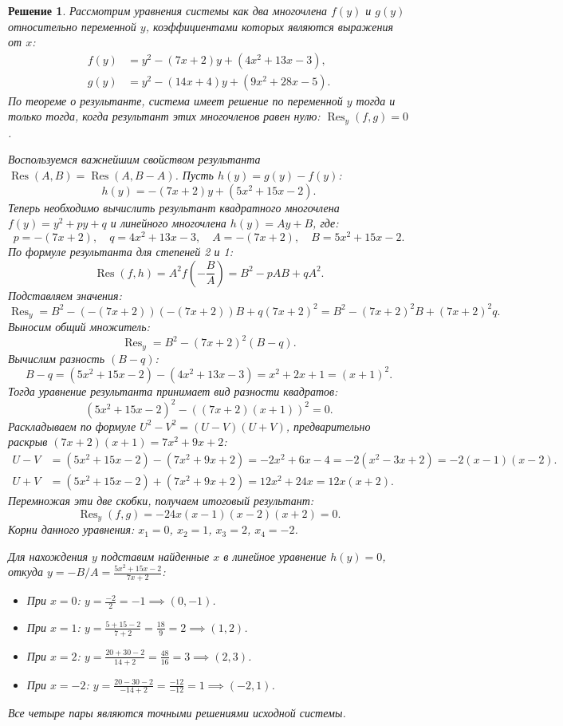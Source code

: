 \documentclass[14pt]{article}
\newtheorem*{solution}{Решение}
\begin{document}
	\begin{solution}
		Рассмотрим уравнения системы как два многочлена $f(y)$ и $g(y)$ относительно переменной $y$, коэффициентами которых являются выражения от $x$:
		\begin{align*}
			f(y) &= y^2 - (7x + 2)y + (4x^2 + 13x - 3), \\
			g(y) &= y^2 - (14x + 4)y + (9x^2 + 28x - 5).
		\end{align*}
		По теореме о результанте, система имеет решение по переменной $y$ тогда и только тогда, когда результант этих многочленов равен нулю: $\operatorname{Res}_y(f, g) = 0$.
		
		Воспользуемся важнейшим свойством результанта $\operatorname{Res}(A, B) = \operatorname{Res}(A, B - A)$. Пусть $h(y) = g(y) - f(y)$:
		\[
		h(y) = -(7x + 2)y + (5x^2 + 15x - 2).
		\]
		Теперь необходимо вычислить результант квадратного многочлена $f(y) = y^2 + py + q$ и линейного многочлена $h(y) = Ay + B$, где:
		\[
		p = -(7x+2), \quad q = 4x^2+13x-3, \quad A = -(7x+2), \quad B = 5x^2+15x-2.
		\]
		По формуле результанта для степеней 2 и 1:
		\[
		\operatorname{Res}(f, h) = A^2 f\left(-\frac{B}{A}\right) = B^2 - p A B + q A^2.
		\]
		Подставляем значения:
		\[
		\operatorname{Res}_y = B^2 - (-(7x+2))(-(7x+2))B + q(7x+2)^2 = B^2 - (7x+2)^2 B + (7x+2)^2 q.
		\]
		Выносим общий множитель:
		\[
		\operatorname{Res}_y = B^2 - (7x+2)^2 (B - q).
		\]
		Вычислим разность $(B - q)$:
		\[
		B - q = (5x^2 + 15x - 2) - (4x^2 + 13x - 3) = x^2 + 2x + 1 = (x+1)^2.
		\]
		Тогда уравнение результанта принимает вид разности квадратов:
		\[
		(5x^2 + 15x - 2)^2 - ((7x+2)(x+1))^2 = 0.
		\]
		Раскладываем по формуле $U^2 - V^2 = (U-V)(U+V)$, предварительно раскрыв $(7x+2)(x+1) = 7x^2 + 9x + 2$:
		\begin{align*}
			U - V &= (5x^2 + 15x - 2) - (7x^2 + 9x + 2) = -2x^2 + 6x - 4 = -2(x^2 - 3x + 2) = -2(x-1)(x-2). \\
			U + V &= (5x^2 + 15x - 2) + (7x^2 + 9x + 2) = 12x^2 + 24x = 12x(x+2).
		\end{align*}
		Перемножая эти две скобки, получаем итоговый результант:
		\[
		\operatorname{Res}_y(f,g) = -24x(x-1)(x-2)(x+2) = 0.
		\]
		Корни данного уравнения: $x_1 = 0$, $x_2 = 1$, $x_3 = 2$, $x_4 = -2$.
		
		Для нахождения $y$ подставим найденные $x$ в линейное уравнение $h(y) = 0$, откуда $y = -B/A = \frac{5x^2 + 15x - 2}{7x + 2}$:
		\begin{itemize}
			\item При $x = 0$: $y = \frac{-2}{2} = -1 \implies (0, -1)$.
			\item При $x = 1$: $y = \frac{5 + 15 - 2}{7 + 2} = \frac{18}{9} = 2 \implies (1, 2)$.
			\item При $x = 2$: $y = \frac{20 + 30 - 2}{14 + 2} = \frac{48}{16} = 3 \implies (2, 3)$.
			\item При $x = -2$: $y = \frac{20 - 30 - 2}{-14 + 2} = \frac{-12}{-12} = 1 \implies (-2, 1)$.
		\end{itemize}
		Все четыре пары являются точными решениями исходной системы.
	\end{solution}
	
\end{document}
